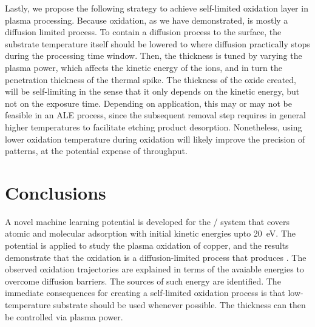 \documentclass[manuscript=cmatex]{achemso}
\begin{document}
Lastly, we propose the following strategy to achieve self-limited oxidation layer in plasma processing. Because oxidation, as we have demonstrated, is mostly a diffusion limited process. To contain a diffusion process to the surface, the substrate temperature itself should be lowered to where diffusion practically stops during the processing time window. Then, the thickness is tuned by varying the plasma power, which affects the kinetic energy of the ions, and in turn the penetration thickness of the thermal spike. The thickness of the oxide created, will be self-limiting in the sense that it only depends on the kinetic energy, but not on the exposure time. Depending on application, this may or may not be feasible in an ALE process, since the subsequent removal step requires in general higher temperatures to facilitate etching product desorption. Nonetheless, using lower oxidation temperature during oxidation will likely improve the precision of patterns, at the potential expense of throughput. 

\section{Conclusions}
A novel machine learning potential is developed for the / system that covers atomic and molecular adsorption with initial kinetic energies upto \SI{20}{eV}. The potential is applied to study the plasma oxidation of copper, and the results demonstrate that the oxidation is a diffusion-limited process that produces . The observed oxidation trajectories are explained in terms of the avaiable energies to overcome diffusion barriers. The sources of such energy are identified. The immediate consequences for creating a self-limited oxidation process is that low-temperature substrate should be used whenever possible. The thickness can then be controlled via plasma power.

\end{document}

